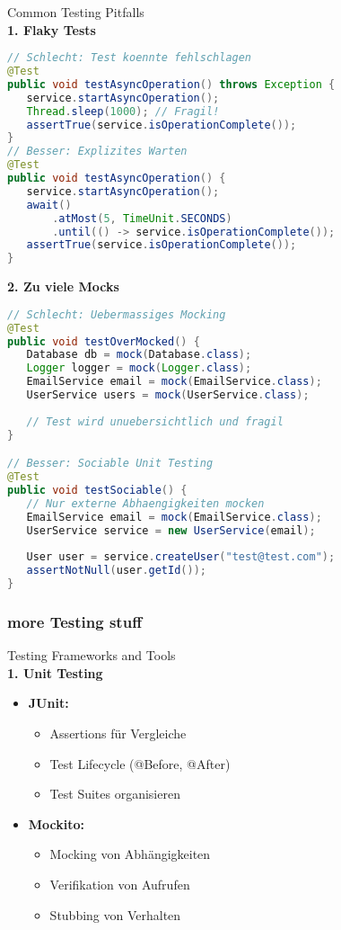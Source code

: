\begin{example2}{Common Testing Pitfalls}\\
\textbf{1. Flaky Tests}
\begin{lstlisting}[language=Java, style=basesmol]
// Schlecht: Test koennte fehlschlagen
@Test
public void testAsyncOperation() throws Exception {
   service.startAsyncOperation();
   Thread.sleep(1000); // Fragil!
   assertTrue(service.isOperationComplete());
}
// Besser: Explizites Warten
@Test
public void testAsyncOperation() {
   service.startAsyncOperation();
   await()
       .atMost(5, TimeUnit.SECONDS)
       .until(() -> service.isOperationComplete());
   assertTrue(service.isOperationComplete());
}
\end{lstlisting}

\textbf{2. Zu viele Mocks}
\begin{lstlisting}[language=Java, style=basesmol]
// Schlecht: Uebermassiges Mocking
@Test
public void testOverMocked() {
   Database db = mock(Database.class);
   Logger logger = mock(Logger.class);
   EmailService email = mock(EmailService.class);
   UserService users = mock(UserService.class);
   
   // Test wird unuebersichtlich und fragil
}

// Besser: Sociable Unit Testing
@Test
public void testSociable() {
   // Nur externe Abhaengigkeiten mocken
   EmailService email = mock(EmailService.class);
   UserService service = new UserService(email);
   
   User user = service.createUser("test@test.com");
   assertNotNull(user.getId());
}
\end{lstlisting}
\end{example2}



\subsubsection{more Testing stuff}

\begin{KR}{Testing Frameworks and Tools}\\
\textbf{1. Unit Testing}
\begin{itemize}
   \item \textbf{JUnit:}
   \begin{itemize}
       \item Assertions für Vergleiche
       \item Test Lifecycle (@Before, @After)
       \item Test Suites organisieren
   \end{itemize}
   \item \textbf{Mockito:}
   \begin{itemize}
       \item Mocking von Abhängigkeiten
       \item Verifikation von Aufrufen
       \item Stubbing von Verhalten
   \end{itemize}
\end{itemize}
\end{KR}

